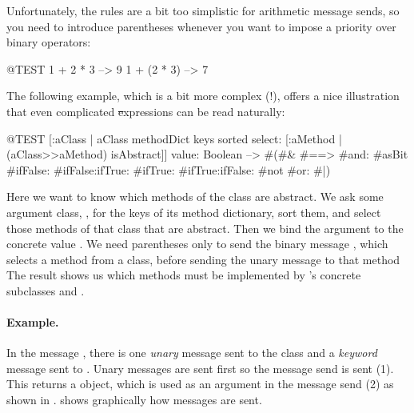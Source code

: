\documentclass[a4paper,10pt,twoside]{book}
\begin{document}
Unfortunately, the rules are a bit too simplistic for arithmetic message sends, so you need to introduce parentheses whenever you want to impose a priority over binary operators:
\begin{code}{@TEST}
1 + 2 * 3   --> 9
1 + (2 * 3) --> 7
\end{code}

The following example, which is a bit more complex (!), offers a nice illustration that even complicated \st expressions can be read naturally:
\begin{code}{@TEST}
[:aClass | aClass methodDict keys sorted select: [:aMethod | (aClass>>aMethod) isAbstract]] value: Boolean --> #(#& #==> #and: #asBit #ifFalse: #ifFalse:ifTrue: #ifTrue: #ifTrue:ifFalse: #not #or: #|)
\end{code}
\noindent
Here we want to know which methods of the  class are abstract.
We ask some argument class, , for the keys of its method dictionary, sort them, and select those methods of that class that are abstract.
Then we bind the argument  to the concrete value .
We need parentheses only to send the binary message \ct{>>}, which selects a method from a class, before sending the unary message \mbox{} to that method
The result shows us which methods must be implemented by 's concrete subclasses  and .



\paragraph{Example.}
In the message , there is one \emph{unary} message  sent to the class  and a \emph{keyword} message  sent to .
Unary messages are sent first so the message send  is sent (1).
This returns a  object, which is used as an argument in the message send  (2) as shown in .
 shows graphically how messages are sent.
\end{document}
